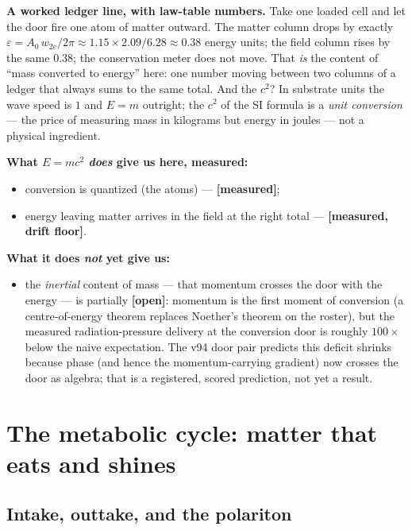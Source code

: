 \textbf{A worked ledger line, with law-table numbers.} Take one loaded
cell and let the door fire one atom of matter outward. The matter column
drops by exactly
\(\varepsilon = A_0\,w_{2e}/2\pi \approx 1.15 \times 2.09 / 6.28 \approx 0.38\)
energy units; the field column rises by the same \(0.38\); the
conservation meter does not move. That \emph{is} the content of ``mass
converted to energy'' here: one number moving between two columns of a
ledger that always sums to the same total. And the \(c^2\)? In substrate
units the wave speed is \(1\) and \(E = m\) outright; the \(c^2\) of the
SI formula is a \emph{unit conversion} --- the price of measuring mass
in kilograms but energy in joules --- not a physical ingredient.

\textbf{What \(E = mc^2\) \emph{does} give us here, measured:}

\begin{itemize}
\tightlist
\item
  conversion is quantized (the atoms) --- \textbf{{[}measured{]}};
\item
  energy leaving matter arrives in the field at the right total ---
  \textbf{{[}measured, drift floor{]}}.
\end{itemize}

\textbf{What it does \emph{not} yet give us:}

\begin{itemize}
\tightlist
\item
  the \emph{inertial} content of mass --- that momentum crosses the door
  with the energy --- is partially \textbf{{[}open{]}}: momentum is the
  first moment of conversion (a centre-of-energy theorem replaces
  Noether's theorem on the roster), but the measured radiation-pressure
  delivery at the conversion door is roughly \(100\times\) below the
  naive expectation. The v94 door pair predicts this deficit shrinks
  because phase (and hence the momentum-carrying gradient) now crosses
  the door as algebra; that is a registered, scored prediction, not yet
  a result.
\end{itemize}

\section{The metabolic cycle: matter that eats and
shines}\label{the-metabolic-cycle-matter-that-eats-and-shines}

\subsection{Intake, outtake, and the
polariton}\label{intake-outtake-and-the-polariton}

